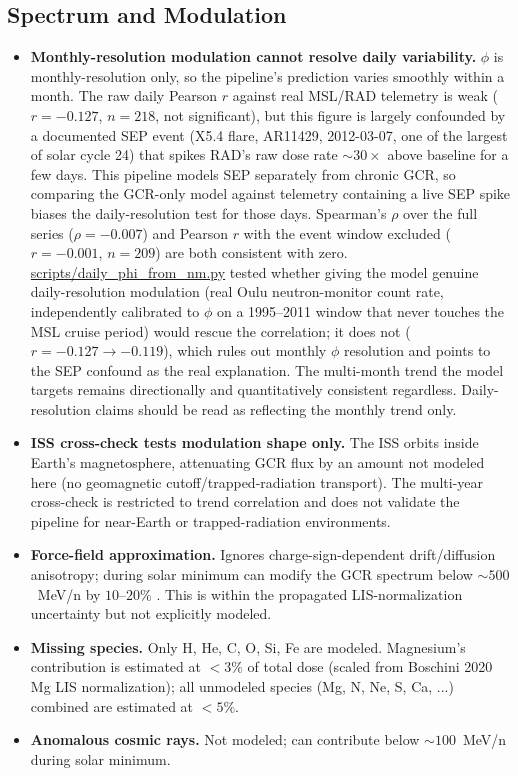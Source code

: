 \documentclass[a4paper,fleqn]{cas-sc}
\begin{document}
\subsection{Spectrum and Modulation}
\begin{itemize}
  \item \textbf{Monthly-resolution modulation cannot resolve daily
        variability.} $\phi$ is monthly-resolution only, so the pipeline's
        prediction varies smoothly within a month. The raw daily Pearson $r$
        against real MSL/RAD telemetry is weak ($r=-0.127$, $n=218$, not
        significant), but this figure is largely confounded by a
        documented SEP event (X5.4 flare, AR11429, 2012-03-07, one of the
        largest of solar cycle 24) that spikes RAD's raw dose rate
        $\sim\!30\times$ above baseline for a few days. This pipeline
        models SEP separately from chronic GCR, so comparing the GCR-only
        model against telemetry containing a live SEP spike biases the
        daily-resolution test for those days. Spearman's $\rho$ over the full
        series ($\rho=-0.007$) and Pearson $r$ with the event window excluded
        ($r=-0.001$, $n=209$) are both consistent with zero.
        \url{scripts/daily_phi_from_nm.py}
        tested whether giving the model genuine daily-resolution modulation
        (real Oulu neutron-monitor count rate, independently calibrated to
        $\phi$ on a 1995--2011 window that never touches the MSL cruise
        period) would rescue the correlation; it does not
        ($r=-0.127\to-0.119$), which rules out monthly $\phi$ resolution and
        points to the SEP confound as the real explanation.
        The multi-month trend the model targets remains directionally and
        quantitatively consistent regardless. Daily-resolution claims should
        be read as reflecting the monthly trend only.
  \item \textbf{ISS cross-check tests modulation shape only.} The ISS orbits
        inside Earth's magnetosphere, attenuating GCR flux by an amount not
        modeled here (no geomagnetic cutoff/trapped-radiation transport).
        The multi-year cross-check is restricted to trend correlation and
        does not validate the pipeline for near-Earth or
        trapped-radiation environments.
  \item \textbf{Force-field approximation.} Ignores charge-sign-dependent
        drift/diffusion anisotropy; during solar minimum can modify the GCR
        spectrum below $\sim\!500$~MeV/n by $10$--$20\%$ \citep{potgieter2013}.
        This is within the propagated LIS-normalization uncertainty but not
        explicitly modeled.
  \item \textbf{Missing species.} Only H, He, C, O, Si, Fe are modeled.
        Magnesium's contribution is estimated at $<3\%$ of total dose (scaled
        from Boschini 2020 Mg LIS normalization); all unmodeled species
        (Mg, N, Ne, S, Ca, ...) combined are estimated at $<5\%$.
  \item \textbf{Anomalous cosmic rays.} Not modeled; can contribute below
        $\sim\!100$~MeV/n during solar minimum.
\end{itemize}
\end{document}

